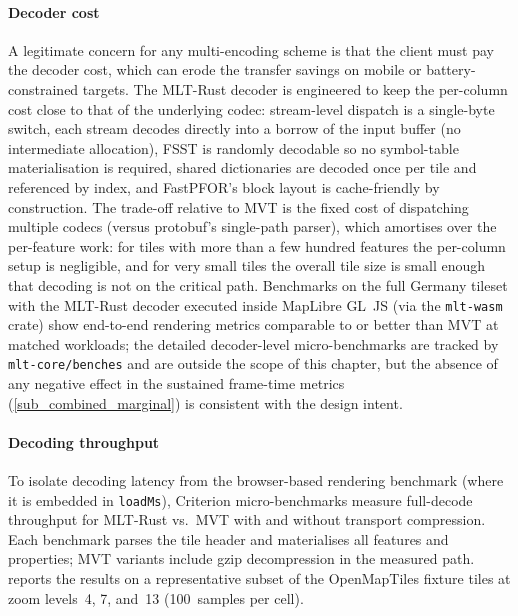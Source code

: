 \paragraph{Decoder cost}
A legitimate concern for any multi-encoding scheme is that the client must pay the decoder cost, which can erode the transfer savings on mobile or battery-constrained targets.
The \ac{MLT}-Rust decoder is engineered to keep the per-column cost close to that of the underlying codec: stream-level dispatch is a single-byte switch, each stream decodes directly into a borrow of the input buffer (no intermediate allocation), \ac{FSST} is randomly decodable so no symbol-table materialisation is required, shared dictionaries are decoded once per tile and referenced by index, and \ac{FastPFOR}'s block layout is cache-friendly by construction.
The trade-off relative to \ac{MVT} is the fixed cost of dispatching multiple codecs (versus protobuf's single-path parser), which amortises over the per-feature work: for tiles with more than a few hundred features the per-column setup is negligible, and for very small tiles the overall tile size is small enough that decoding is not on the critical path.
Benchmarks on the full Germany tileset with the \ac{MLT}-Rust decoder executed inside MapLibre GL~JS (via the \texttt{mlt-wasm} crate) show end-to-end rendering metrics comparable to or better than \ac{MVT} at matched workloads; the detailed decoder-level micro-benchmarks are tracked by \texttt{mlt-core/benches} and are outside the scope of this chapter, but the absence of any negative effect in the sustained frame-time metrics (\cref{sub_combined_marginal}) is consistent with the design intent.


\paragraph{Decoding throughput}
To isolate decoding latency from the browser-based rendering benchmark (where it is embedded in \texttt{loadMs}), Criterion micro-benchmarks measure full-decode throughput for \ac{MLT}-Rust vs.\ \ac{MVT} with and without transport compression.
Each benchmark parses the tile header and materialises all features and properties; \ac{MVT} variants include gzip decompression in the measured path.
 reports the results on a representative subset of the OpenMapTiles fixture tiles at zoom levels~4, 7, and~13 (100~samples per cell).

